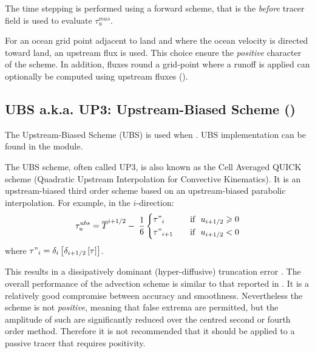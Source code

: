 \documentclass[../main/NEMO_manual]{subfiles}
\begin{document}
The time stepping is performed using a forward scheme,
that is the \textit{before} tracer field is used to evaluate $\tau_u^{mus}$.

For an ocean grid point adjacent to land and where the ocean velocity is directed toward land,
an upstream flux is used.
This choice ensure the \textit{positive} character of the scheme.
In addition, fluxes round a grid-point where a runoff is applied can optionally be computed using upstream fluxes
().

\subsection{UBS a.k.a. UP3: Upstream-Biased Scheme (\protect{})}
\label{subsec:TRA_adv_ubs}

The Upstream-Biased Scheme (UBS) is used when .
UBS implementation can be found in the  module.

The UBS scheme, often called UP3, is also known as the Cell Averaged QUICK scheme
(Quadratic Upstream Interpolation for Convective Kinematics).
It is an upstream-biased third order scheme based on an upstream-biased parabolic interpolation.
For example, in the $i$-direction:
\begin{equation}
  \label{eq:tra_adv_ubs}
  \tau_u^{ubs} =\overline T ^{i+1/2}-\;\frac{1}{6} \left\{
    \begin{aligned}
      &\tau"_i        	& \quad \text{if }\ u_{i+1/2} \geqslant 0      \\
      &\tau"_{i+1}	& \quad \text{if }\ u_{i+1/2}       <       0
    \end{aligned}
  \right.
\end{equation}
where $\tau "_i =\delta_i \left[ {\delta_{i+1/2} \left[ \tau \right]} \right]$.

This results in a dissipatively dominant (\ie hyper-diffusive) truncation error
\citep{Shchepetkin_McWilliams_OM05}.
The overall performance of the advection scheme is similar to that reported in \cite{Farrow1995}.
It is a relatively good compromise between accuracy and smoothness.
Nevertheless the scheme is not \emph{positive}, meaning that false extrema are permitted,
but the amplitude of such are significantly reduced over the centred second or fourth order method.
Therefore it is not recommended that it should be applied to a passive tracer that requires positivity.
\end{document}
